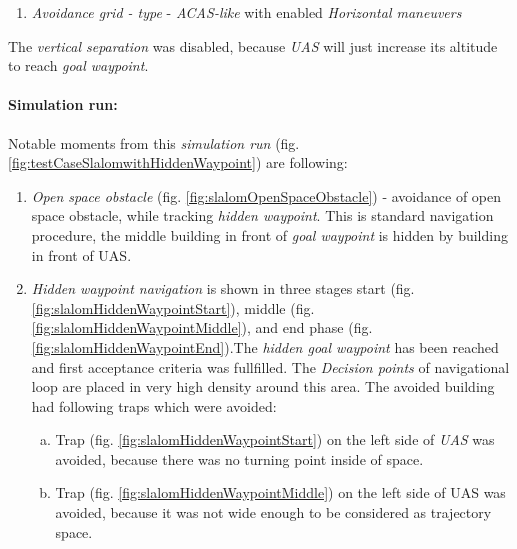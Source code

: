 \begin{enumerate}
    \item \emph{Avoidance grid - type} - \emph{ACAS-like} with enabled \emph{Horizontal maneuvers}
\end{enumerate}

\begin{note}
The \emph{vertical separation} was disabled, because \emph{UAS} will just increase its altitude to reach \emph{goal waypoint}.
\end{note}

\paragraph{Simulation run:} Notable moments from this \emph{simulation run} (fig. \ref{fig:testCaseSlalomwithHiddenWaypoint}) are following:

\begin{enumerate}
    \item \emph{Open space obstacle} (fig. \ref{fig:slalomOpenSpaceObstacle}) - avoidance of open space obstacle, while tracking \emph{hidden waypoint}. This is standard navigation procedure, the middle building in front of \emph{goal waypoint} is hidden by building in front of UAS.
        
    \item \emph{Hidden waypoint navigation} is shown in three stages start (fig. \ref{fig:slalomHiddenWaypointStart}), middle (fig. \ref{fig:slalomHiddenWaypointMiddle}), and end phase (fig. \ref{fig:slalomHiddenWaypointEnd}).The \emph{hidden goal waypoint} has been reached and first acceptance criteria was fullfilled.  The \emph{Decision points} of navigational loop are placed in very high density around this area. The avoided building had following traps which were avoided:
    
    \begin{enumerate}[a.]
        \item Trap (fig. \ref{fig:slalomHiddenWaypointStart}) on the left side of \emph{UAS} was avoided, because there was no turning point inside of space.
    
        \item Trap (fig. \ref{fig:slalomHiddenWaypointMiddle}) on the left side of UAS was avoided, because it was not wide enough to be considered as trajectory space.
    \end{enumerate}
\end{enumerate}


